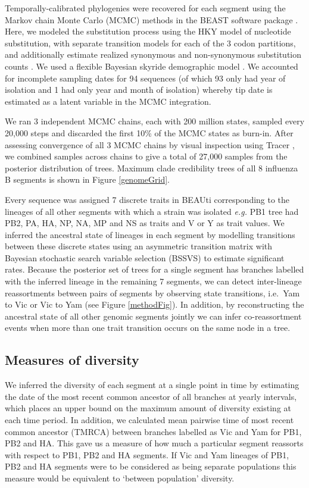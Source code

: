 \documentclass[11pt,oneside,letterpaper]{article}
\begin{document}
Temporally-calibrated phylogenies were recovered for each segment using the Markov chain Monte Carlo (MCMC) methods in the BEAST software package \cite{drummond2012}.
Here, we modeled the substitution process using the HKY model of nucleotide substitution, with separate transition models for each of the 3 codon partitions, and additionally estimate realized synonymous and non-synonymous substitution counts \cite{obrien2009}.
We used a flexible Bayesian skyride demographic model \cite{minin2008}.
We accounted for incomplete sampling dates for 94 sequences (of which 93 only had year of isolation and 1 had only year and month of isolation) whereby tip date is estimated as a latent variable in the MCMC integration.

We ran 3 independent MCMC chains, each with 200 million states, sampled every 20,000 steps and discarded the first 10\% of the MCMC states as burn-in.
After assessing convergence of all 3 MCMC chains by visual inspection using Tracer \cite{tracer}, we combined samples across chains to give a total of 27,000 samples from the posterior distribution of trees.
Maximum clade credibility trees of all 8 influenza B segments is shown in Figure \ref{genomeGrid}.

Every sequence was assigned 7 discrete traits in BEAUti corresponding to the lineages of all other segments with which a strain was isolated \textit{e.g.} PB1 tree had PB2, PA, HA, NP, NA, MP and NS as traits and V or Y as trait values.
We inferred the ancestral state of lineages in each segment by modelling transitions between these discrete states using an asymmetric transition matrix \cite{lemey2009} with Bayesian stochastic search variable selection (BSSVS) to estimate significant rates. Because the posterior set of trees for a single segment has branches labelled with the inferred lineage in the remaining 7 segments, we can detect inter-lineage reassortments between pairs of segments by observing state transitions, i.e.\ Yam to Vic or Vic to Yam (see Figure \ref{methodFig}). 
In addition, by reconstructing the ancestral state of all other genomic segments jointly we can infer co-reassortment events when more than one trait transition occurs on the same node in a tree.

\subsection*{Measures of diversity}
We inferred the diversity of each segment at a single point in time by estimating the date of the most recent common ancestor of all branches at yearly intervals, which places an upper bound on the maximum amount of diversity existing at each time period.
In addition, we calculated mean pairwise time of most recent common ancestor (TMRCA) between branches labelled as Vic and Yam for PB1, PB2 and HA.
This gave us a measure of how much a particular segment reassorts with respect to PB1, PB2 and HA segments.
If Vic and Yam lineages of PB1, PB2 and HA segments were to be considered as being separate populations this measure would be equivalent to `between population' diversity.
\end{document}
